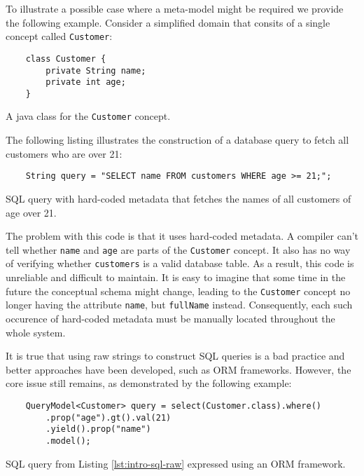 \n

To illustrate a possible case where a meta-model might be required we provide the following example.
Consider a simplified domain that consits of a single concept called \texttt{Customer}:

\begin{listing}[H]
    \begin{verbatim}
    class Customer {
        private String name;
        private int age;
    }
    \end{verbatim}
    \caption{A java class for the \texttt{Customer} concept.}
    \label{lst:intro-customer}
\end{listing}

The following listing illustrates the construction of a database query to fetch all customers who are over 21:

\begin{listing}[H]
    \begin{verbatim}
    String query = "SELECT name FROM customers WHERE age >= 21;";
    \end{verbatim}
    \caption{SQL query with hard-coded metadata that fetches the names of all customers of age over 21.}
    \label{lst:intro-sql-raw}
\end{listing}

The problem with this code is that it uses hard-coded metadata.
A compiler can't tell whether \texttt{name} and \texttt{age} are parts of the \texttt{Customer} concept.
It also has no way of verifying whether \texttt{customers} is a valid database table.
As a result, this code is unreliable and difficult to maintain.
It is easy to imagine that some time in the future the conceptual schema might change, leading to the \texttt{Customer} concept no longer having the attribute \texttt{name}, but \texttt{fullName} instead.
Consequently, each such occurence of hard-coded metadata must be manually located throughout the whole system.

\n

It is true that using raw strings to construct SQL queries is a bad practice and better approaches have been developed, such as ORM frameworks.
However, the core issue still remains, as demonstrated by the following example:

\begin{listing}[H]
    \begin{verbatim}
    QueryModel<Customer> query = select(Customer.class).where()
        .prop("age").gt().val(21)
        .yield().prop("name")
        .model();
    \end{verbatim}
    \caption{SQL query from Listing \ref{lst:intro-sql-raw} expressed using an ORM framework.}
    \label{lst:intro-eql}
\end{listing}

